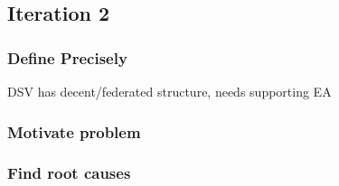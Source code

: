 

\subsection{Iteration 2}

\subsubsection*{Define Precisely}

DSV has decent/federated structure, needs supporting EA


\subsubsection*{Motivate problem}


\subsubsection*{Find root causes}




%
%
%
%
%

